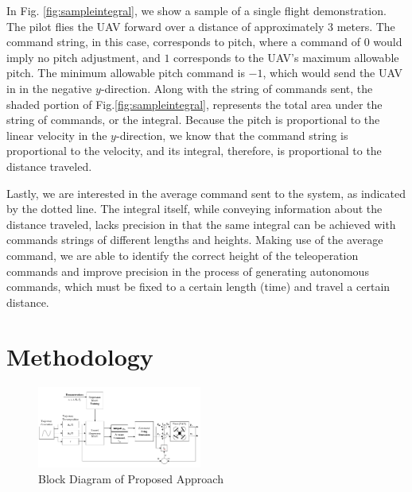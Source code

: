 \documentclass[letterpaper, 10 pt, conference]{ieeeconf}  %
\newcommand\NB[1]{$\spadesuit$\footnote{NB: #1}}
\begin{document}
In Fig. \ref{fig:sampleintegral}, we show a sample of a single flight demonstration. The pilot flies the UAV forward over a distance of approximately $3$ meters. The command string, in this case, corresponds to pitch, where a command of $0$ would imply no pitch adjustment, and $1$ corresponds to the UAV's maximum allowable pitch. The minimum allowable pitch command is $-1$, which would send the UAV in in the negative $y$-direction. Along with the string of commands sent, the shaded portion of Fig.\ref{fig:sampleintegral}, represents the total area under the string of commands, or the integral. Because the pitch is proportional to the linear velocity in the $y$-direction, we know that the command string is proportional to the velocity, and its integral, therefore, is proportional to the distance traveled.


Lastly, we are interested in the average command sent to the system, as indicated by the dotted line. The integral itself, while conveying information about the distance traveled, lacks precision in that the same integral can be achieved with commands strings of different lengths and heights. Making use of the average command, we are able to identify the correct height of the teleoperation commands and improve precision in the process of generating autonomous commands, which must be fixed to a certain length (time) and travel a certain distance. %

\section{Methodology}

\begin{figure}[ht]
    \includegraphics[width=0.48\textwidth]{images/blocks.PNG}
    \caption{Block Diagram of Proposed Approach}
    \label{fig:blockdiagram}
\end{figure}
\end{document}
